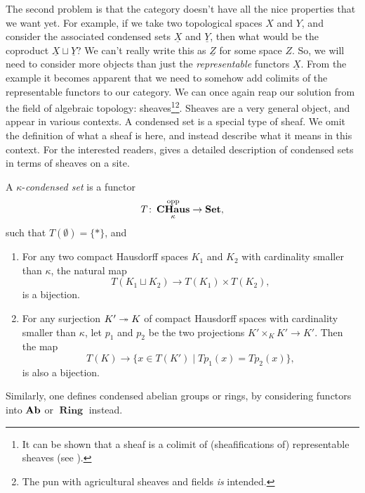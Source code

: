 \documentclass{article}
\DeclareMathOperator{\opp}{opp}
\DeclareMathOperator{\CHaus}{\mathbf{CHaus}}
\DeclareMathOperator{\Ring}{\mathbf{Ring}}
\begin{document}
The second problem is that the category doesn't have all
the nice properties that we want yet. For example,
if we take two topological spaces $X$ and $Y$, and
consider the associated condensed sets $\underline{X}$
and $\underline{Y}$, then what would be the coproduct
$\underline{X} \sqcup \underline{Y}$? We can't
really write this as $\underline{Z}$ for some space $Z$.
So, we will need to consider more objects than just
the \emph{representable} functors $\underline{X}$.
From the example it becomes apparent that we need
to somehow add colimits of the representable functors
to our category. We can once again reap our solution from
the field of algebraic topology: sheaves\footnote{
    It can be shown that a sheaf is a colimit of (sheafifications of) representable
    sheaves (see
    \cite[\href{https://stacks.math.columbia.edu/tag/0GLW}{Lemma 0GLW}]{stacks-project}).
}\footnote{
    The pun with agricultural sheaves and fields \emph{is} intended.
}. Sheaves are a very general object, and appear in various
contexts. A condensed set is a special type of sheaf.
We omit the definition of what a sheaf is here, and instead
describe what it means in this context. For the interested
readers, \cite[Section 1.2]{Dag2021FoundationsCM} gives
a detailed description of condensed sets in terms of sheaves
on a site.
\begin{definition}
    A $\kappa$-\emph{condensed set} is a functor
    \begin{equation*}
        T \colon \CHaus_{\kappa}^{\opp} \to \Set,
    \end{equation*}
    such that $T(\emptyset) = \{*\}$, and
    \begin{enumerate}
        \item For any two compact Hausdorff spaces $K_1$ and $K_2$ with cardinality
              smaller than $\kappa$, the natural map
              \begin{equation*}
                  T(K_1 \sqcup K_2) \to T(K_1) \times T(K_2),
              \end{equation*}
              is a bijection.
        \item For any surjection $K' \twoheadrightarrow K$ of compact Hausdorff spaces
              with cardinality smaller than $\kappa$, let $p_1$ and $p_2$
              be the two projections $K'\times_K K' \to K'$. Then the map
              \begin{equation*}
                  T(K) \to \{x \in T(K') \mid Tp_1(x) = Tp_2(x)\},
              \end{equation*}
              is also a bijection.
    \end{enumerate}
\end{definition}
Similarly, one defines condensed abelian groups or rings, by considering
functors into $\operatorname{\mathbf{Ab}}$ or $\Ring$ instead.
\end{document}
